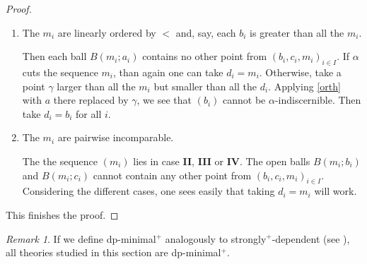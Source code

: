 \documentclass[english]{article}
\theoremstyle{definition}
\theoremstyle{mystyle}
\theoremstyle{remark}
\newtheorem{rem}[thm]{Remark}
\begin{document}
\begin{proof}
\begin{enumerate}
\item The $m_i$ are linearly ordered by $<$ and, say, each $b_i$ is greater than all the $m_i$.

Then each ball $B(m_i;a_i)$ contains no other point from $(b_i,c_i,m_i)_{i \in I}$. If $\alpha$ cuts the sequence $m_i$, than again one can take $d_i =m_i$. Otherwise, take a point $\gamma$ larger than all the $m_i$ but smaller than all the $d_i$. Applying \ref{orth} with $a$ there replaced by $\gamma$, we see that $(b_i)$ cannot be $\alpha$-indiscernible. Then take $d_i = b_i$ for all $i$.

\item The $m_i$ are pairwise incomparable.

The the sequence $(m_i)$ lies in case \textbf{II}, \textbf{III} or \textbf{IV}. The open balls $B(m_i;b_i)$ and $B(m_i;c_i)$ cannot contain any other point from $(b_i,c_i,m_i)_{i\in I}$. Considering the different cases, one sees easily that taking $d_i = m_i$ will work.
\end{enumerate}

This finishes the proof.

\end{proof}

\begin{rem}
If we define dp-minimal$^+$ analogously to strongly$^+$-dependent (see \cite{Sh863}), all theories studied in this section are dp-minimal$^+$.
\end{rem}
\end{document}
